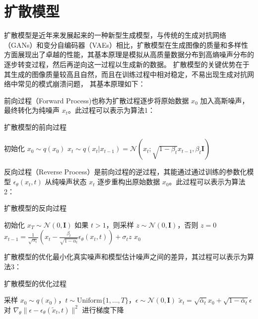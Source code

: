 \documentclass[a4paper,AutoFakeBold,oneside,12pt]{book}
\begin{document}
\section{扩散模型}
扩散模型是近年来发展起来的一种新型生成模型，与传统的生成对抗网络（GANs）和变分自编码器（VAEs）相比，扩散模型在生成图像的质量和多样性方面展现出了卓越的性能，其基本原理是模拟从高质量数据分布到高熵噪声分布的逐步转变过程，然后再逆向这一过程以生成新的数据。
扩散模型的关键优势在于其生成的图像质量较高且自然，而且在训练过程中相对稳定，不易出现生成对抗网络中常见的模式崩溃问题，
其基本原理如下：

前向过程（Forward Process)也称为扩散过程逐步将原始数据 \( x_0 \) 加入高斯噪声，最终转化为纯噪声 \( x_t \)。此过程可以表示为算法1：
\begin{algorithm}
    \caption{扩散模型的前向过程}
    \begin{algorithmic}[1]
    \State 初始化 $x_0 \sim q(x_0)$
        \State $x_t \sim q(x_t|x_{t-1}) = \mathcal{N}(x_t; \sqrt{1-\beta_t}x_{t-1}, \beta_t \mathbf{I})$
    \EndFor
    \end{algorithmic}
\end{algorithm}

反向过程（Reverse Process）是前向过程的逆过程，其能通过通过训练的参数化模型 \( \epsilon_\theta(x_t, t) \) 从纯噪声状态 \( x_t \) 逐步重构出原始数据 \( x_0 \)。此过程可以表示为算法2：
\begin{algorithm}
    \caption{扩散模型的反向过程}
    \begin{algorithmic}[1]
    \State 初始化 $x_T \sim \mathcal{N}(0, \mathbf{I})$
        \State 如果 $t > 1$，则采样 $z \sim \mathcal{N}(0, \mathbf{I})$，否则 $z = 0$
        \State $x_{t-1} = \frac{1}{\sqrt{\alpha_t}}\left(x_t - \frac{\beta_t}{\sqrt{1-\bar{\alpha}_t}}\epsilon_\theta(x_t, t)\right) + \sigma_t z$
    \EndFor
    \State \Return $x_0$
    \end{algorithmic}
\end{algorithm}


扩散模型的优化最小化真实噪声和模型估计噪声之间的差异，其过程可以表示为算法3：
\begin{algorithm}
    \caption{扩散模型的优化过程}
    \begin{algorithmic}[1]
    \Repeat
        \State 采样 $x_0 \sim q(x_0)$，$t \sim \text{Uniform}\{1, \dots, T\}$，$\epsilon \sim \mathcal{N}(0, \mathbf{I})$
        \State $\tilde{x}_t = \sqrt{\bar{\alpha}_t}x_0 + \sqrt{1-\bar{\alpha}_t}\epsilon$
        \State 对 $\nabla_\theta \|\epsilon - \epsilon_\theta(\tilde{x}_t, t)\|^2$ 进行梯度下降
    \end{algorithmic}
\end{algorithm}
\end{document}
